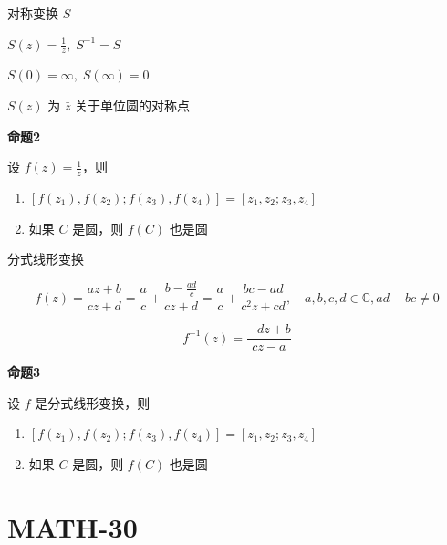 对称变换 \(S\)

\(S(z)=\frac{1}{z}, \; S^{-1}=S\)

\(S(0)=\infty, \; S(\infty)=0\)

\(S(z)\) 为 \(\bar{z}\) 关于单位圆的对称点

\textbf{命题2}

设 \(f(z)=\frac{1}{z}\)，则

\begin{enumerate}
\def\labelenumi{\arabic{enumi}.}
\tightlist
\item
  \([f(z_{1}),f(z_{2});f(z_{3}),f(z_{4})]=[z_{1},z_{2};z_{3},z_{4}]\)
\item
  如果 \(C\) 是圆，则 \(f(C)\) 也是圆
\end{enumerate}

分式线形变换

\[
f(z)=\frac{az+b}{cz+d}= \frac{a}{c}+\frac{b-\frac{ad}{c} }{cz+d}=\frac{a}{c}+\frac{bc-ad}{c^{2}z+cd}, \quad a, b, c, d \in \mathbb{C},ad-bc\neq{}0
\]

\[
f^{-1}(z)= \frac{-dz+b}{cz-a}
\]

\textbf{命题3}

设 \(f\) 是分式线形变换，则

\begin{enumerate}
\def\labelenumi{\arabic{enumi}.}
\tightlist
\item
  \([f(z_{1}),f(z_{2});f(z_{3}),f(z_{4})]=[z_{1},z_{2};z_{3},z_{4}]\)
\item
  如果 \(C\) 是圆，则 \(f(C)\) 也是圆
\end{enumerate}

\section{MATH-30}\label{math-30}
